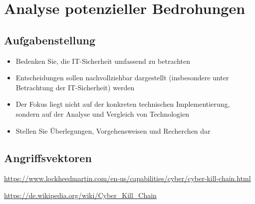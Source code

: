 \section{Analyse potenzieller Bedrohungen}

\subsection*{Aufgabenstellung}
\begin{itemize}
    \item Bedenken Sie, die IT-Sicherheit umfassend zu betrachten
    \item  Entscheidungen sollen nachvollziehbar dargestellt (insbesondere unter Betrachtung der IT-Sicherheit) werden
    \item Der Fokus liegt nicht auf der konkreten technischen Implementierung, sondern auf der Analyse
    und Vergleich von Technologien
    \item Stellen Sie Überlegungen, Vorgehensweisen und Recherchen dar
\end{itemize}

\subsection{Angriffsvektoren}

\url{https://www.lockheedmartin.com/en-us/capabilities/cyber/cyber-kill-chain.html}

\url{https://de.wikipedia.org/wiki/Cyber_Kill_Chain}